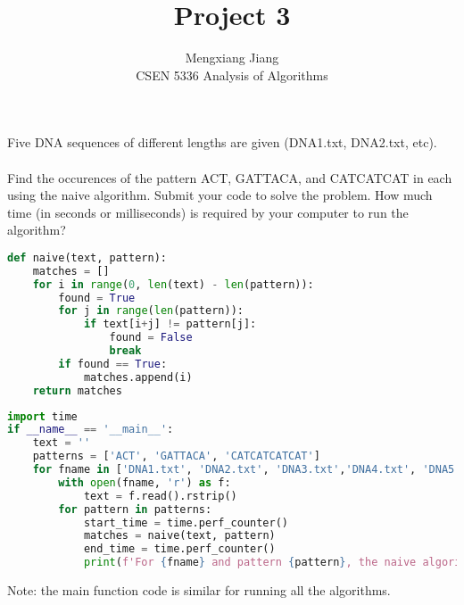 \documentclass[12pt]{article}
\newenvironment{problem}[2][Problem]{\begin{trivlist}
\item[\hskip \labelsep {\bfseries #1}\hskip \labelsep {\bfseries #2.}]}{\end{trivlist}}
\begin{document}
 
 
\title{Project 3}%
\author{Mengxiang Jiang\\ %
CSEN 5336 Analysis of Algorithms} %
 
\maketitle
 
\begin{problem}{1} %
Five DNA sequences of different lengths are given (DNA1.txt, DNA2.txt, etc).\\\\
Find the occurences of the pattern ACT, GATTACA, and CATCATCAT in each using the naive algorithm. Submit your code to solve the problem.
How much time (in seconds or milliseconds) is required by your computer to run the
algorithm?
\begin{lstlisting}[language=Python, caption=naive algorithm]
def naive(text, pattern):
    matches = []
    for i in range(0, len(text) - len(pattern)):
        found = True
        for j in range(len(pattern)):
            if text[i+j] != pattern[j]:
                found = False
                break
        if found == True:
            matches.append(i)
    return matches
\end{lstlisting}
\begin{lstlisting}[language=Python, caption=main function code]
import time
if __name__ == '__main__':
    text = ''
    patterns = ['ACT', 'GATTACA', 'CATCATCATCAT']
    for fname in ['DNA1.txt', 'DNA2.txt', 'DNA3.txt','DNA4.txt', 'DNA5.txt']:
        with open(fname, 'r') as f:
            text = f.read().rstrip()
        for pattern in patterns:
            start_time = time.perf_counter()
            matches = naive(text, pattern)
            end_time = time.perf_counter()
            print(f'For {fname} and pattern {pattern}, the naive algorithm took {end_time-start_time} seconds with {len(matches)} matches')
\end{lstlisting}
Note: the main function code is similar for running all the algorithms.
\pagebreak
\begin{lstlisting}[language=C, caption=Terminal output running code]

\end{lstlisting}
\end{problem}
\end{document}
